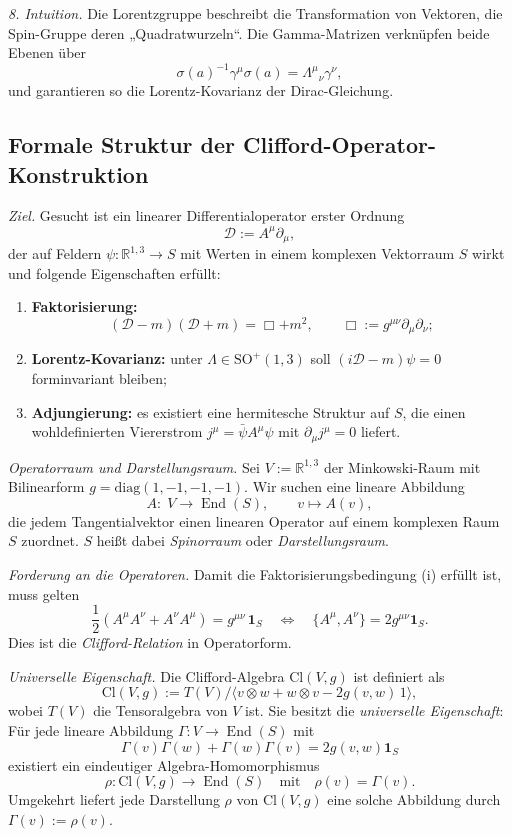 \documentclass[10pt, letterpaper]{article}
\newcommand{\R}{\mathbb{R}}
\newcommand{\Cl}{\mathrm{Cl}}
\newcommand{\SO}{\mathrm{SO}}
\begin{document}
\emph{8. Intuition.}
Die Lorentzgruppe beschreibt die Transformation von Vektoren,
die Spin-Gruppe deren „Quadratwurzeln“.
Die Gamma-Matrizen verknüpfen beide Ebenen über
\[
\sigma(a)^{-1}\gamma^\mu\sigma(a)=\Lambda^\mu{}_\nu\gamma^\nu,
\]
und garantieren so die Lorentz-Kovarianz der Dirac-Gleichung.


\pagebreak

\subsection{Formale Struktur der Clifford-Operator-Konstruktion}

\emph{Ziel.}
Gesucht ist ein linearer Differentialoperator erster Ordnung
\[
\mathcal D := A^\mu \partial_\mu,
\]
der auf Feldern $\psi:\R^{1,3}\to S$ mit Werten in einem komplexen Vektorraum $S$ wirkt und folgende Eigenschaften erfüllt:
\begin{enumerate}
\item[(i)] \textbf{Faktorisierung:}
\[
(\mathcal D - m)(\mathcal D + m) = \Box + m^2,
\qquad \Box := g^{\mu\nu}\partial_\mu\partial_\nu;
\]
\item[(ii)] \textbf{Lorentz-Kovarianz:}
unter $\Lambda\in\SO^+(1,3)$ soll $(i\mathcal D - m)\psi=0$ forminvariant bleiben;
\item[(iii)] \textbf{Adjungierung:}
es existiert eine hermitesche Struktur auf $S$, die einen wohldefinierten Viererstrom
$j^\mu = \bar\psi A^\mu \psi$ mit $\partial_\mu j^\mu=0$ liefert.
\end{enumerate}

\emph{Operatorraum und Darstellungsraum.}
Sei $V:=\R^{1,3}$ der Minkowski-Raum mit Bilinearform $g=\mathrm{diag}(1,-1,-1,-1)$.
Wir suchen eine lineare Abbildung
\[
A:\;V\longrightarrow \operatorname{End}(S),
\qquad v\longmapsto A(v),
\]
die jedem Tangentialvektor einen linearen Operator auf einem komplexen Raum $S$ zuordnet.
$S$ heißt dabei \emph{Spinorraum} oder \emph{Darstellungsraum}.

\emph{Forderung an die Operatoren.}
Damit die Faktorisierungsbedingung (i) erfüllt ist, muss gelten
\[
\frac12(A^\mu A^\nu + A^\nu A^\mu) = g^{\mu\nu}\,\mathbf 1_S
\quad\Longleftrightarrow\quad
\{A^\mu,A^\nu\}=2g^{\mu\nu}\mathbf 1_S.
\]
Dies ist die \emph{Clifford-Relation} in Operatorform.

\emph{Universelle Eigenschaft.}
Die Clifford-Algebra $\Cl(V,g)$ ist definiert als
\[
\Cl(V,g)
:= T(V)\Big/\big\langle v\otimes w + w\otimes v - 2g(v,w)\,1\big\rangle,
\]
wobei $T(V)$ die Tensoralgebra von $V$ ist.  
Sie besitzt die \emph{universelle Eigenschaft}:  
Für jede lineare Abbildung $\Gamma:V\to\operatorname{End}(S)$ mit
\[
\Gamma(v)\Gamma(w)+\Gamma(w)\Gamma(v)=2g(v,w)\mathbf 1_S
\]
existiert ein eindeutiger Algebra-Homomorphismus
\[
\rho:\Cl(V,g)\longrightarrow\operatorname{End}(S)
\quad\text{mit}\quad \rho(v)=\Gamma(v).
\]
Umgekehrt liefert jede Darstellung $\rho$ von $\Cl(V,g)$ eine solche Abbildung durch $\Gamma(v):=\rho(v)$.
\end{document}
